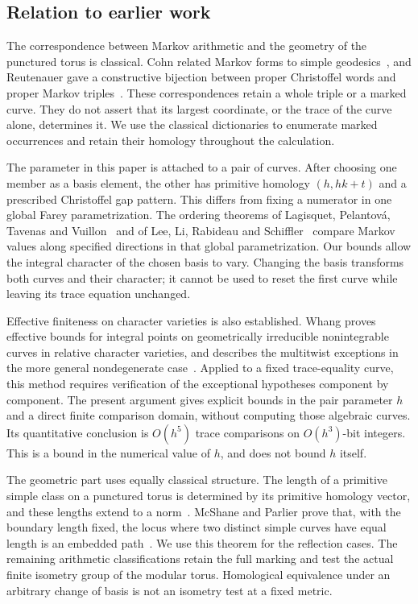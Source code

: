 \subsection{Relation to earlier work}
\label{sec:literature}

The correspondence between Markov arithmetic and the geometry of the
punctured torus is classical. Cohn related Markov forms to simple
geodesics~\cite{Cohn1971}, and Reutenauer gave a constructive bijection
between proper Christoffel words and proper Markov
triples~\cite[Theorem~1]{Reutenauer2009}. These correspondences retain a
whole triple or a marked curve. They do not assert that its largest
coordinate, or the trace of the curve alone, determines it. We use the
classical dictionaries to enumerate marked occurrences and retain their
homology throughout the calculation.

The parameter in this paper is attached to a pair of curves. After choosing
one member as a basis element, the other has primitive homology
$(h,hk+t)$ and a prescribed Christoffel gap pattern. This differs from
fixing a numerator in one global Farey parametrization. The ordering
theorems of Lagisquet, Pelantov{\'a}, Tavenas and Vuillon~\cite{LagisquetEtAl2021}
and of Lee, Li, Rabideau and Schiffler~\cite{LeeEtAl2023} compare Markov
values along specified directions in that global parametrization.
Our bounds allow the integral character of the chosen basis to vary.
Changing the basis transforms both curves and their character; it cannot
be used to reset the first curve while leaving its trace equation unchanged.

Effective finiteness on character varieties is also established. Whang
proves effective bounds for integral points on geometrically irreducible
nonintegrable curves in relative character varieties, and describes the
multitwist exceptions in the more general nondegenerate
case~\cite[Theorems~1.2--1.3]{Whang2020}. Applied to a fixed trace-equality
curve, this method requires verification of the exceptional hypotheses
component by component. The present argument gives explicit bounds in
the pair parameter $h$ and a direct finite comparison domain, without
computing those algebraic curves. Its quantitative conclusion is
$O(h^5)$ trace comparisons on $O(h^3)$-bit integers. This is a bound in
the numerical value of $h$, and does not bound $h$ itself.

The geometric part uses equally classical structure. The length of a
primitive simple class on a punctured torus is determined by its primitive
homology vector, and these lengths extend to a norm~\cite{McShaneRivin1995}.
McShane and Parlier prove that, with the boundary length fixed, the locus
where two distinct simple curves have equal length is an embedded
path~\cite[Theorem~1.3]{McShaneParlier2008}. We use this theorem
for the reflection cases. The remaining arithmetic classifications retain
the full marking and test the actual finite isometry group of the modular
torus. Homological equivalence under an arbitrary change of basis is not
an isometry test at a fixed metric.

